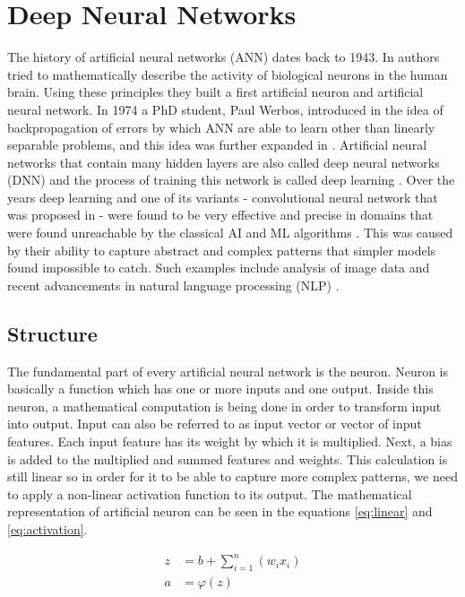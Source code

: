 \chapter{Deep Neural Networks}

The history of artificial neural networks (ANN) dates back to 1943. In \cite{McCulloch1943} authors tried to mathematically describe the activity of biological neurons in the human brain. Using these principles they built a first artificial neuron and artificial neural network. In 1974 a PhD student, Paul Werbos, introduced in \cite{Werbos1974} the idea of backpropagation of errors by which ANN are able to learn other than linearly separable problems, and this idea was further expanded in \cite{Rumelhart1986}. Artificial neural networks that contain many hidden layers are also called deep neural networks (DNN) and the process of training this network is called deep learning \cite{LeCun2015}. Over the years deep learning and one of its variants - convolutional neural network that was proposed in \cite{LeCun2015-2} - were found to be very effective and precise in domains that were found unreachable by the classical AI and ML algorithms \cite{LeCun2015}. This was caused by their ability to capture abstract and complex patterns that simpler models found impossible to catch. Such examples include analysis of image data \cite{Farabet2013, Alzubaidi2021} and recent advancements in natural language processing (NLP) \cite{Deng2018}.

\section{Structure}
The fundamental part of every artificial neural network is the neuron. Neuron is basically a function which has one or more inputs and one output. Inside this neuron, a mathematical computation is being done in order to transform input into output. Input can also be referred to as input vector or vector of input features. Each input feature has its weight by which it is multiplied. Next, a bias is added to the multiplied and summed features and weights. This calculation is still linear so in order for it to be able to capture more complex patterns, we need to apply a non-linear activation function to its output. The mathematical representation of artificial neuron can be seen in the equations \ref{eq:linear} and \ref{eq:activation}.

\begin{align}
\label{eq:linear}
    z &= b + \sum_{i=1}^n (w_i x_i) \\
\label{eq:activation}
    a &= \varphi(z)
\end{align}

